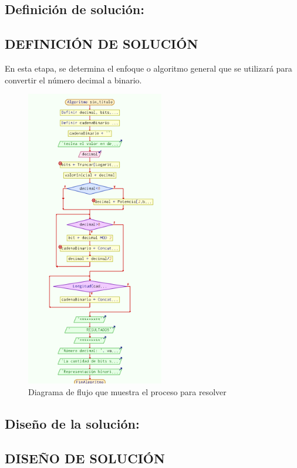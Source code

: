 \subsection{\textbf{Definición de solución:}}

\subsection{\textbf{DEFINICIÓN DE SOLUCIÓN} }
En esta etapa, se determina el enfoque o algoritmo general que se utilizará para convertir el número decimal a binario. 


\begin{figure}[H]
\centering
\includegraphics[width=6cm]{LaTeX/latex-imagenes/1.png}
\caption{Diagrama de flujo que muestra el proceso para resolver }
\label{fig:diagrama_flujo}

\end{figure}


\subsection{\textbf{Diseño de la solución:}}

\subsection{\textbf{DISEÑO DE SOLUCIÓN} }
